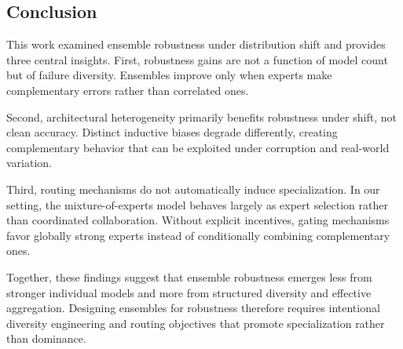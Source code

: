 \subsection{Conclusion}
This work examined ensemble robustness under distribution shift and provides three central insights.
First, robustness gains are not a function of model count but of failure diversity. Ensembles improve only when experts make complementary errors rather than correlated ones.

Second, architectural heterogeneity primarily benefits robustness under shift, not clean accuracy. Distinct inductive biases degrade differently, creating complementary behavior that can be exploited under corruption and real-world variation.

Third, routing mechanisms do not automatically induce specialization. In our setting, the mixture-of-experts model behaves largely as expert selection rather than coordinated collaboration. Without explicit incentives, gating mechanisms favor globally strong experts instead of conditionally combining complementary ones.

Together, these findings suggest that ensemble robustness emerges less from stronger individual models and more from structured diversity and effective aggregation. Designing ensembles for robustness therefore requires intentional diversity engineering and routing objectives that promote specialization rather than dominance.